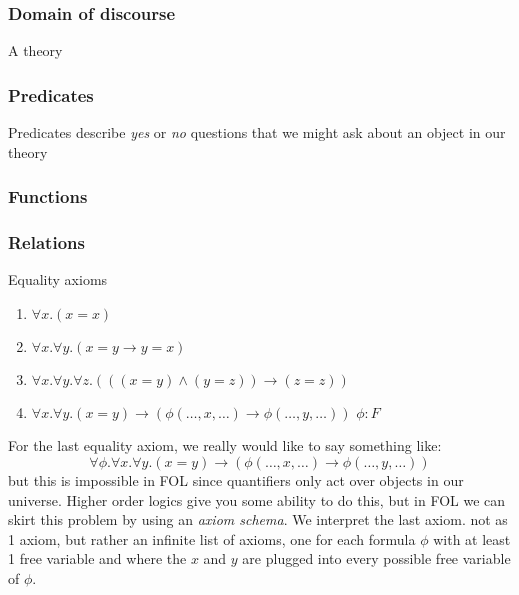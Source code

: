 \documentclass[10pt]{article}
\begin{document}
	\subsubsection{Domain of discourse}
	
	A theory
	
	\subsubsection{Predicates}
	
	Predicates describe \emph{yes} or \emph{no} questions that we might ask about an object in our theory
	
	\subsubsection{Functions}	
	\subsubsection{Relations}
	
	Equality axioms
	
	\begin{tcolorbox}[colback=green!5!white,colframe=green!75!black,title={\bf Axioms of equality}]
		\begin{enumerate}[itemsep=0pt, label={E.\arabic*}]
			\item $\forall x. (x = x)$ \label{ax:eq-refl}
			\item $\forall x. \forall y. (x=y \to y=x)$ \label{ax:eq-sym}
			\item $\forall x. \forall y. \forall z. (((x=y) \land (y=z)) \to (z=z))$ \label{ax:eq-trans} 
			\item $\forall x. \forall y. (x = y) \to (\phi(\dots,x,\ldots) \to \phi(\ldots,y,\ldots))$ \hfill $\phi:F$
		\end{enumerate}
	\end{tcolorbox}

	\noindent
	
	For the last equality axiom, we really would like to say something like:
	$$\forall \phi. \forall x. \forall y. (x = y) \to (\phi(\dots,x,\ldots) \to \phi(\ldots,y,\ldots))$$
	but this is impossible in FOL since quantifiers only act over objects in our universe.
	Higher order logics give you some ability to do this, but in FOL we can skirt this problem by using an \emph{axiom schema}.
	We interpret the last axiom. not as 1 axiom, but rather an infinite list of axioms, one for each formula $\phi$ with at least 1 free variable and where the $x$ and $y$ are plugged into every possible free variable of $\phi$.
	
\end{document}
